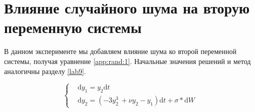 \clearpage
\section{Влияние случайного шума на вторую
переменную системы}

В данном эксперименте мы добавляем влияние шума
ко второй переменной системы, получая уравнение \ref{app:rand:1}.
Начальные значения решений и метод аналогичны разделу \ref{lab9}.

\begin{equation}\label{app:rand:1}
\begin{cases}
    &\mathrm{d}y_1 = y_2\mathrm{d}t\\
    &\mathrm{d}y_2 = (-3y_2^3\ + \nu y_2 - y_1)\mathrm{d}t + \sigma * \mathrm{d}W
\end{cases}
\end{equation}

